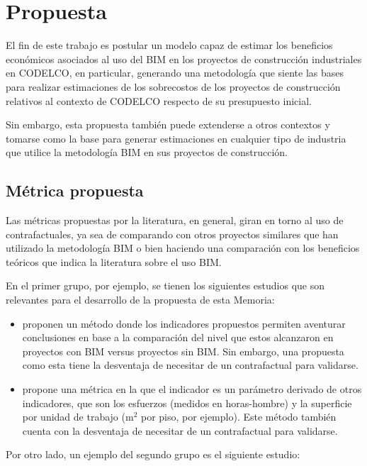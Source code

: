 \chapter{Propuesta}

El fin de este trabajo es postular un modelo capaz de estimar los beneficios económicos asociados al uso del BIM en los proyectos de construcción industriales en CODELCO, en particular, generando una metodología que siente las bases para realizar estimaciones de los sobrecostos de los proyectos de construcción relativos al contexto de CODELCO respecto de su presupuesto inicial.

Sin embargo, esta propuesta también puede extenderse a otros contextos y tomarse como la base para generar estimaciones en cualquier tipo de industria que utilice la metodología BIM en sus proyectos de construcción.

\section{Métrica propuesta}

Las métricas propuestas por la literatura, en general, giran en torno al uso de contrafactuales, ya sea de comparando con otros proyectos similares que han utilizado la metodología BIM o bien haciendo una comparación con los beneficios teóricos que indica la literatura sobre el uso BIM.

En el primer grupo, por ejemplo, se tienen los siguientes estudios que son relevantes para el desarrollo de la propuesta de esta Memoria:

\begin{itemize}
    \item {} proponen un método donde los indicadores propuestos permiten aventurar conclusiones en base a la comparación del nivel que estos alcanzaron en proyectos con BIM versus proyectos sin BIM. Sin embargo, una propuesta como esta tiene la desventaja de necesitar de un contrafactual para validarse.
    \item {} propone una métrica en la que el indicador es un parámetro derivado de otros indicadores, que son los esfuerzos (medidos en horas-hombre) y la superficie por unidad de trabajo (m$^2$ por piso, por ejemplo). Este método también cuenta con la desventaja de necesitar de un contrafactual para validarse.
\end{itemize}

Por otro lado, un ejemplo del segundo grupo es el siguiente estudio:

